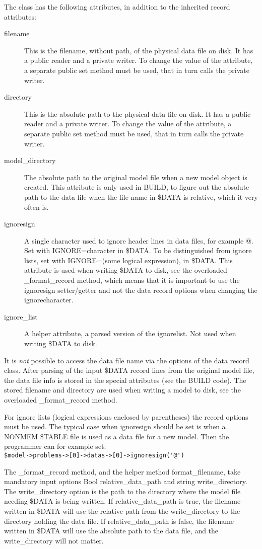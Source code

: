 The class has the following attributes, in addition to the inherited record attributes:
\begin{description}
\item[filename] This is the filename, without path, of the physical data file on disk. It has a public reader and a private writer. To change the
value of the attribute, a
separate public set method must be used, that in turn calls the private writer.
\item[directory] This is the absolute path to the physical data file on disk. It has a public reader and a private writer.
To change the value of the attribute, a
separate public set method must be used, that in turn calls the private writer.
\item[model\_directory] The absolute path to the original model file when a new model object is created.
This attribute is only used in BUILD, to figure
out the absolute path to the data file when the file name in \$DATA is relative, which it very often is.
\item[ignoresign] A single character used to ignore header lines in data files, for example @. Set with IGNORE=character
in \$DATA. To be distinguished from ignore lists, set with IGNORE=(some logical expression), in \$DATA. This attribute
is used when writing \$DATA to disk, see the overloaded \_format\_record method,
which means that it is important to use the ignoresign setter/getter and
not the data record options when changing the ignorecharacter.
\item[ignore\_list] A helper attribute, a parsed version of the ignorelist. Not used when writing \$DATA to disk.
\end{description}

It is \emph{not} possible to access the data file name via the options of the data record class. After parsing of
the input \$DATA record lines from the original model file, the data file info is stored in the special attributes
(see the BUILD code). The stored filename and directory are used when writing a model to disk, see
the overloaded \_format\_record method.

For ignore lists (logical expressions enclosed by parentheses) the record options must be used.
The typical case when ignoresign should be set is when a NONMEM \$TABLE file is used as a data file for
a new model. Then the programmer can for example set:\\ \verb|$model->problems->[0]->datas->[0]->ignoresign('@')|

The \_format\_record method, and the helper method format\_filename, take mandatory input options Bool relative\_data\_path and
string write\_directory.
The write\_directory option is the path to the directory where the model file needing \$DATA is being written.
If relative\_data\_path is true, the filename written in \$DATA will use the relative path from the write\_directory to the
directory holding the data file. If relative\_data\_path is false, the filename written in \$DATA will use the absolute
path to the data file, and the write\_directory will not matter.

